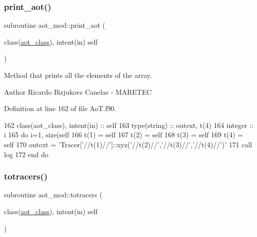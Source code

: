 \subsubsection{\texorpdfstring{print\+\_\+aot()}{print\_aot()}}
{\footnotesize\ttfamily subroutine aot\+\_\+mod\+::print\+\_\+aot (\begin{DoxyParamCaption}\item[{class(\mbox{\hyperlink{structaot__mod_1_1aot__class}{aot\+\_\+class}}), intent(in)}]{self }\end{DoxyParamCaption})\hspace{0.3cm}{\ttfamily [private]}}



Method that prints all the elements of the array. 

\begin{DoxyAuthor}{Author}
Ricardo Birjukovs Canelas -\/ M\+A\+R\+E\+T\+EC 
\end{DoxyAuthor}


Definition at line 162 of file Ao\+T.\+f90.


\begin{DoxyCode}
162     \textcolor{keywordtype}{class}(aot\_class), \textcolor{keywordtype}{intent(in)} :: self
163     \textcolor{keywordtype}{type}(string) :: outext, t(4)
164     \textcolor{keywordtype}{integer} :: i
165     \textcolor{keywordflow}{do} i=1, \textcolor{keyword}{size}(self%
166         t(1) = self%
167         t(2) = self%
168         t(3) = self%
169         t(4) = self%
170         outext = \textcolor{stringliteral}{'Tracer['}//t(1)//\textcolor{stringliteral}{']::xyz('}//t(2)//\textcolor{stringliteral}{','}//t(3)//\textcolor{stringliteral}{','}//t(4)//\textcolor{stringliteral}{')'}
171         \textcolor{keyword}{call }log%
172 \textcolor{keywordflow}{    end do}
\end{DoxyCode}
\mbox{\label{namespaceaot__mod_a73ecd8babd54975720741493be733c48}} 
\subsubsection{\texorpdfstring{totracers()}{totracers()}}
{\footnotesize\ttfamily subroutine aot\+\_\+mod\+::totracers (\begin{DoxyParamCaption}\item[{class(\mbox{\hyperlink{structaot__mod_1_1aot__class}{aot\+\_\+class}}), intent(in)}]{self }\end{DoxyParamCaption})\hspace{0.3cm}{\ttfamily [private]}}



